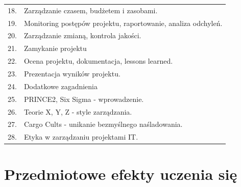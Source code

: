 \documentclass[12pt, a4paper]{article}
\begin{document}
{\begin{longtable}{m{1.5cm}m{14.5cm}}
  \rowcolor{tableRowAlt} 18. & Zarządzanie czasem, budżetem i zasobami. \\
  \rowcolor{tableRowLight} 19. & Monitoring postępów projektu, raportowanie, analiza odchyleń. \\
  \rowcolor{tableRowAlt} 20. & Zarządzanie zmianą, kontrola jakości. \\
  \rowcolor{tableRowLight} 21. & Zamykanie projektu \\
  \rowcolor{tableRowAlt} 22. & Ocena projektu, dokumentacja, lessons learned. \\
  \rowcolor{tableRowLight} 23. & Prezentacja wyników projektu. \\
  \rowcolor{tableRowAlt} 24. & Dodatkowe zagadnienia \\
  \rowcolor{tableRowLight} 25. & PRINCE2, Six Sigma - wprowadzenie. \\
  \rowcolor{tableRowAlt} 26. & Teorie X, Y, Z - style zarządzania. \\
  \rowcolor{tableRowLight} 27. & Cargo Cults - unikanie bezmyślnego naśladowania. \\
  \rowcolor{tableRowAlt} 28. & Etyka w zarządzaniu projektami IT. \\
\bottomrule
\end{longtable}}

\section{Przedmiotowe efekty uczenia się}
\end{document}
